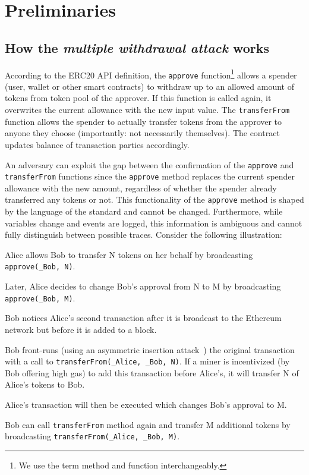 
\section{Preliminaries}

\subsection{How the \textit{multiple withdrawal attack} works}

According to the ERC20 API definition, the \texttt{approve} function\footnote{We use the term method and function interchangeably.}
allows a spender (\eg user, wallet or other smart contracts) to withdraw up to an allowed amount of tokens from token pool of the approver. If this function is called again, it overwrites the current allowance with the new input value. The \texttt{transferFrom} function allows the spender to actually transfer tokens from the approver to anyone they choose (importantly: not necessarily themselves). The contract updates balance of transaction parties accordingly. 

An adversary can exploit the gap between the confirmation of the \texttt{approve} and \texttt{transferFrom} functions since the \texttt{approve} method replaces the current spender allowance with the new amount, regardless of whether the spender already transferred any tokens or not. This functionality of the \texttt{approve} method is shaped by the language of the standard and cannot be changed. Furthermore, while variables change and events are logged, this information is ambiguous and cannot fully distinguish between possible traces. Consider the following illustration:

\begin{compactlistn}
	\item Alice allows Bob to transfer N tokens on her behalf by broadcasting \texttt{approve(\_Bob, N)}.
	\item Later, Alice decides to change Bob's approval from N to M  by broadcasting \texttt{approve(\_Bob, M)}.
	\item Bob notices Alice's second transaction after it is broadcast to the Ethereum network but before it is added to a block.
	\item Bob front-runs (using an asymmetric insertion attack~\cite{eskandari2019sok}) the original transaction with a call to   \texttt{transferFrom(\_Alice, \_Bob, N)}. If a miner is incentivized (\eg by Bob offering high gas) to add this transaction before Alice's, it will transfer N of Alice's tokens to Bob.
	\item Alice's transaction will then be executed which changes Bob's approval to M.
	\item Bob can call \texttt{transferFrom} method again and transfer M additional tokens by broadcasting \texttt{transferFrom(\_Alice, \_Bob, M)}.
\end{compactlistn}

